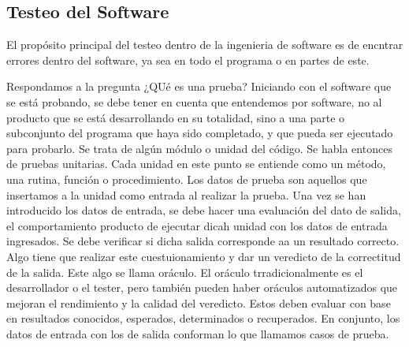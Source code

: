 \subsection{Testeo del Software}

El propósito principal del testeo dentro de la ingenieria de software es de encntrar errores dentro del software, ya sea en todo el programa o en partes de este. 

Respondamos a la pregunta ¿QUé es una prueba? Iniciando con el software que se está probando, se debe tener en cuenta que entendemos por software, no al producto que se está desarrollando en su totalidad, sino a una parte o subconjunto del programa que haya sido completado, y que pueda ser ejecutado para probarlo. Se trata de algún módulo o unidad del código. Se habla entonces de pruebas unitarias. Cada unidad en este punto se entiende como un método, una rutina, función o procedimiento. 
Los datos de prueba son aquellos que insertamos a la unidad como entrada al realizar la prueba. Una vez se han introducido los datos de entrada, se debe hacer una evaluación del dato de salida, el comportamiento producto de ejecutar dicah unidad con los datos de entrada ingresados. Se debe verificar si dicha salida corresponde aa un resultado correcto. Algo tiene que realizar este cuestuionamiento y dar un veredicto de la correctitud de la salida. Este algo se llama oráculo. El oráculo trradicionalmente es el desarrollador o el tester, pero también pueden haber oráculos automatizados que mejoran el rendimiento y la calidad del veredicto. Estos deben evaluar con base en resultados conocidos, esperados, determinados o recuperados. En conjunto, los datos de entrada con los de salida conforman lo que llamamos casos de prueba. \\

